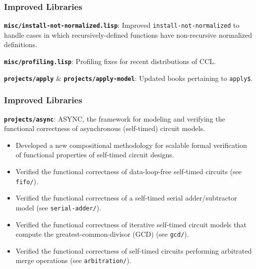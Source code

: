 \documentclass{beamer}
\newcommand{\code}[1]{\texttt{#1}}
\newcommand{\bookpath}[1]{\textbf{\code{#1}}}
\newcommand{\implibtitle}{\frametitle{Improved Libraries}}
\newcommand{\separation}{\vspace*{1ex}}
\begin{document}
\begin{frame}

\implibtitle

\bookpath{misc/install-not-normalized.lisp}:
Improved \code{install-not-normalized} to handle cases in which
recursively-defined functions have non-recursive normalized
definitions.

\separation

\bookpath{misc/profiling.lisp}:
Profiling fixes for recent distributions of CCL.

\separation

\bookpath{projects/apply} \& \bookpath{projects/apply-model}:
Updated books pertaining to \code{apply\$}.

\end{frame}


\begin{frame}

\implibtitle

\bookpath{projects/async}:
ASYNC, the framework for modeling and verifying the functional correctness
of asynchronous (self-timed) circuit models.
\begin{itemize}
\item
Developed a new compositional methodology for scalable formal
verification of functional properties of self-timed circuit designs.
\item
Verified the functional correctness of data-loop-free self-timed
circuits (see \code{fifo/}).
\item
Verified the functional correctness of a self-timed serial
adder/subtractor model (see \code{serial-adder/}).
\item
Verified the functional correctness of iterative self-timed circuit
models that compute the greatest-common-divisor (GCD) (see \code{gcd/}).
\item
Verified the functional correctness of self-timed circuits performing
arbitrated merge operations (see \code{arbitration/}).
\end{itemize}

\end{frame}

\end{document}
